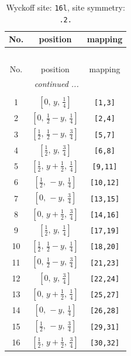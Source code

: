 \documentclass[fleqn,8pt]{jsarticle}
\begin{document}
\renewcommand{\arraystretch}{1.2}
\begin{longtable}{ccc}
\caption{Wyckoff site: {\tt 16l}, site symmetry: {\tt .2.}}
 \\
 \hline \hline
No. & position & mapping \\ \hline \endfirsthead

\multicolumn{2}{l}{\tablename\ \thetable{}} \\
 \hline \hline
No. & position & mapping \\ \hline \endhead

 \hline \hline
\multicolumn{2}{r}{\footnotesize\it continued ...} \\ \endfoot

 \hline \hline
\multicolumn{2}{r}{} \\ \endlastfoot

1 & $\left[ 0,\, y,\, \frac{1}{4} \right]$ & {\tt [1,3]} \\ \hline
2 & $\left[ 0,\, \frac{1}{2} - y,\, \frac{1}{4} \right]$ & {\tt [2,4]} \\ \hline
3 & $\left[ \frac{1}{2},\, \frac{1}{2} - y,\, \frac{3}{4} \right]$ & {\tt [5,7]} \\ \hline
4 & $\left[ \frac{1}{2},\, y,\, \frac{3}{4} \right]$ & {\tt [6,8]} \\ \hline
5 & $\left[ \frac{1}{2},\, y + \frac{1}{2},\, \frac{1}{4} \right]$ & {\tt [9,11]} \\ \hline
6 & $\left[ \frac{1}{2},\, - y,\, \frac{1}{4} \right]$ & {\tt [10,12]} \\ \hline
7 & $\left[ 0,\, - y,\, \frac{3}{4} \right]$ & {\tt [13,15]} \\ \hline
8 & $\left[ 0,\, y + \frac{1}{2},\, \frac{3}{4} \right]$ & {\tt [14,16]} \\ \hline
9 & $\left[ \frac{1}{2},\, y,\, \frac{1}{4} \right]$ & {\tt [17,19]} \\ \hline
10 & $\left[ \frac{1}{2},\, \frac{1}{2} - y,\, \frac{1}{4} \right]$ & {\tt [18,20]} \\ \hline
11 & $\left[ 0,\, \frac{1}{2} - y,\, \frac{3}{4} \right]$ & {\tt [21,23]} \\ \hline
12 & $\left[ 0,\, y,\, \frac{3}{4} \right]$ & {\tt [22,24]} \\ \hline
13 & $\left[ 0,\, y + \frac{1}{2},\, \frac{1}{4} \right]$ & {\tt [25,27]} \\ \hline
14 & $\left[ 0,\, - y,\, \frac{1}{4} \right]$ & {\tt [26,28]} \\ \hline
15 & $\left[ \frac{1}{2},\, - y,\, \frac{3}{4} \right]$ & {\tt [29,31]} \\ \hline
16 & $\left[ \frac{1}{2},\, y + \frac{1}{2},\, \frac{3}{4} \right]$ & {\tt [30,32]} \\
\end{longtable}
\end{document}
